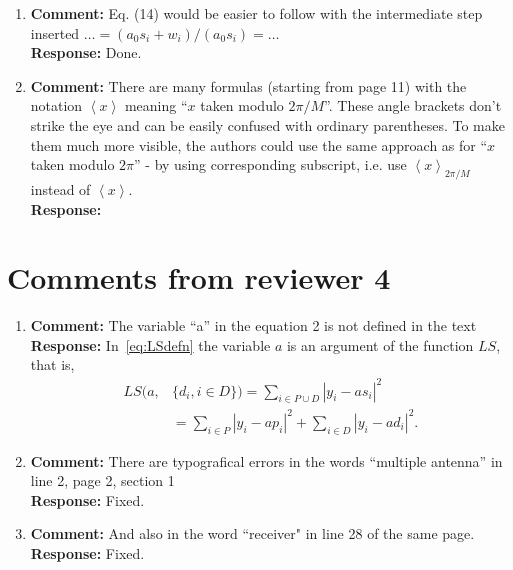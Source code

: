 \documentclass{article}
\newcommand{\fracpart}[1]{\left\langle #1 \right\rangle}
\newcommand{\abs}[1]{{\left\vert #1 \right\vert}}
\begin{document}
\begin{enumerate}

\item \textbf{Comment:}  Eq. (14) would be easier to follow with the intermediate step inserted $\dots = (a_0s_i + w_i)/(a_0s_i) = \dots$ \\
\textbf{Response:} Done.

\item \textbf{Comment:}  There are many formulas (starting from page 11) with the notation $\fracpart{x}$ meaning ``$x$ taken modulo $2\pi/M$''. These angle brackets don't strike the eye and can be easily confused with ordinary parentheses. To make them much more visible, the authors could use the same approach as for ``$x$ taken modulo $2\pi$'' - by using corresponding subscript, i.e. use $\fracpart{x}_{2\pi/M}$ instead of $\fracpart{x}$. \\
\textbf{Response:}

 \end{enumerate}

\section{Comments from reviewer 4}

\begin{enumerate}

\item \textbf{Comment:}  The variable  ``a'' in the equation 2 is not defined in the text \\
\textbf{Response:} In~\eqref{eq:LSdefn} the variable $a$ is an argument of the function $LS$, that is,
\[
\begin{split}
LS(a, &\{d_i, i \in D\}) = \sum_{i \in P \cup D} \abs{ y_i - a s_i }^2  \\
&= \sum_{i \in P} \abs{ y_i - a p_i }^2 + \sum_{i \in D} \abs{ y_i - a d_i }^2.
\end{split}
\]

\item \textbf{Comment:}  There are typografical errors in the words  ``multiple antenna'' in line 2, page 2, section 1 \\
\textbf{Response:} Fixed.

\item \textbf{Comment:}  And also in the word ``receiver" in line 28 of the same page.
 \\
\textbf{Response:} Fixed.


\end{enumerate}


\end{document}
